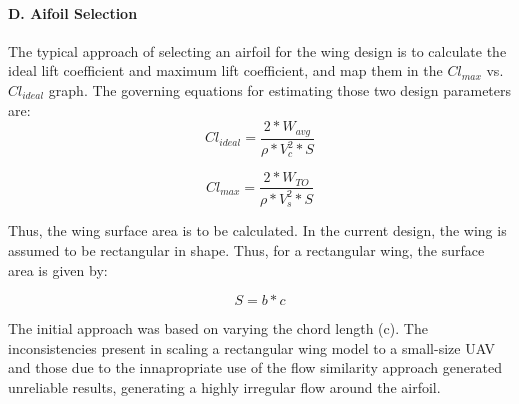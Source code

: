 \documentclass[12pt]{article}
\begin{document}
\paragraph{D. Aifoil Selection}
The typical approach of selecting an airfoil for the wing design is to calculate the ideal lift coefficient and maximum lift coefficient, and map them in the $Cl_{max}$  vs. $Cl_{ideal}$ graph. The governing equations for estimating those two design parameters are: \\

\begin{equation}
    Cl_{ideal} = \frac{2 * W_{avg}}{\rho * V_c^2 * S}
\end{equation}  

\begin{equation}
    Cl_{max} = \frac{2 * W_{TO}}{\rho * V_s^2 * S}
\end{equation}  

\noindent %

\noindent Thus, the wing surface area is to be calculated. In the current design, the wing is assumed to be rectangular in shape. Thus, for a rectangular wing, the surface area is given by: 

\begin{equation}
    S = b * c
\end{equation}

\noindent %

\noindent The initial approach was based on varying the chord length (c). The inconsistencies present in scaling a rectangular wing model to a small-size UAV and those due to the innapropriate use of the flow similarity approach generated unreliable results, generating a highly irregular flow around the airfoil. \\
\end{document}
